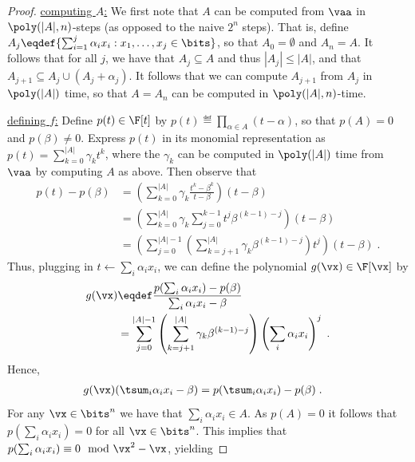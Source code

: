 \documentclass{toc}
\begin{document}
\begin{proof}
        \uline{computing $A$:} We first note that $A$ can be computed from $\vaa$ in $\poly(|A|,n)$-steps (as opposed to the naive $2^n$ steps).  That is, define $A_j\eqdef\{\sum_{i=1}^j \alpha_i x_i : x_1,\ldots,x_j\in\bits\}$, so that $A_0=\emptyset$ and $A_n=A$.  It follows that for all $j$, we have that $A_j\subseteq A$ and thus $|A_j|\le |A|$, and that $A_{j+1}\subseteq A_j\cup (A_j+\alpha_j)$.  It follows that we can compute $A_{j+1}$ from $A_j$ in $\poly(|A|)$ time, so that $A=A_n$ can be computed in $\poly(|A|,n)$-time.

        \uline{defining $f$:}
        Define $p(t)\in\F[t]$ by $p(t)\eqdef\prod_{\alpha\in A}(t-\alpha)$, so that $p(A)=0$ and $p(\beta)\ne 0$.  Express $p(t)$ in its monomial representation as $p(t)=\sum_{k=0}^{|A|} \gamma_k t^k$, where the $\gamma_k$ can be computed in $\poly(|A|)$ time from $\vaa$ by computing $A$ as above.  Then observe that
        \begin{align*}
                p(t)-p(\beta)
                &=\left(\sum_{k=0}^{|A|} \gamma_k\frac{t^k-\beta^k}{t-\beta}\right)(t-\beta)\\
                &=\left(\sum_{k=0}^{|A|} \gamma_k\sum_{j=0}^{k-1} t^{j}\beta^{(k-1)-j}\right)(t-\beta)\\
                &=\left(\sum_{j=0}^{|A|-1}\left(\sum_{k=j+1}^{|A|} \gamma_k\beta^{(k-1)-j} \right)t^j\right)(t-\beta)
                \;.
        \end{align*}
        Thus, plugging in $t\leftarrow \sum_i \alpha_i x_i$, we can define the polynomial $g(\vx)\in\F[\vx]$ by
        \begin{align}
                g(\vx)
                &\eqdef\frac{p(\sum_i \alpha_i x_i)-p(\beta)}{\sum_i \alpha_i x_i -\beta}\nonumber\\
                &=\sum_{j=0}^{|A|-1}\left(\sum_{k=j+1}^{|A|} \gamma_k\beta^{(k-1)-j} \right) \left(\sum_i \alpha_i x_i\right)^j\label{eq:subset}
                \;.
        \end{align}
        Hence,
        \begin{align*}
                g(\vx) (\tsum_i \alpha_ix_i-\beta)
                &=p(\tsum_i \alpha_i x_i)-p(\beta)
                \;.
        \end{align*}
        For any $\vx\in\bits^n$ we have that $\sum_i \alpha_i x_i\in A$.  As $p(A)=0$ it follows that $p(\sum_i \alpha_i x_i)=0$ for all $\vx\in\bits^n$. This implies that $p(\sum_i \alpha_i x_i)\equiv 0 \mod \vx^2-\vx$, yielding

\end{proof}
\end{document}

